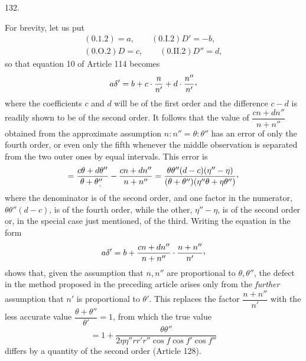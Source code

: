 \par{}\medskip
\begin{center}\hypertarget{native-179}{}\hypertarget{native-179-article132}{}132.\end{center}
For brevity, let us put
\[
\begin{gathered}
(0.1.2)=a,\qquad (0.\mathrm{I}.2)D'=-b,\\
(0.\mathrm{O}.2)D=c,\qquad (0.\mathrm{II}.2)D''=d,
\end{gathered}
\]
so that equation 10 of Article 114 becomes
\[
a\delta'=b+c\cdot\frac{n}{n'}+d\cdot\frac{n''}{n'}\mathpunct{\raisebox{.45ex}{,}}
\]
where the coefficients $c$ and $d$ will be of the first order and the difference $c-d$ is readily shown
to be of the second order. It follows that the value of $\dfrac{cn+dn''}{n+n''}$ obtained from the approximate assumption
$n:n''=\theta:\theta''$ has an error of only the fourth order, or even only the fifth whenever the middle observation is
separated from the two outer ones by equal intervals. This error is
\[
=\frac{c\theta+d\theta''}{\theta+\theta''\mathpunct{\mkern-8mu\raisebox{-.65ex}{.}\mkern8mu}}
-\frac{cn+dn''}{n+n''}
=\frac{\theta\theta''(d-c)(\eta''-\eta)}{(\theta+\theta'')(\eta''\theta+\eta\theta'')}\mathpunct{\raisebox{.45ex}{,}}
\]
where the denominator is of the second order, and one factor in the numerator, $\theta\theta''(d-c)$, is of the
fourth order, while the other, $\eta''-\eta$, is of the second order or, in the special case just mentioned,
of the third. Writing the equation in the form
\[
a\delta'=b+\frac{cn+dn''}{n+n''}\cdot\frac{n+n''}{n'}\mathpunct{\raisebox{.45ex}{,}}
\]
shows that, given the assumption that $n,n''$ are proportional to $\theta,\theta''$, the defect in the
method proposed in the preceding article arises only from the \textit{further} assumption
that $n'$ is proportional to $\theta'$. This replaces the factor $\dfrac{n+n''}{n'}$ with the less accurate value $\dfrac{\theta+\theta''}{\theta'}=1$,
from which the true value
\[
=1+\frac{\theta\theta''}{2\eta\eta''rr'r''\cos f\cos f'\cos f''}
\]
differs by a quantity of the second order (Article 128).
